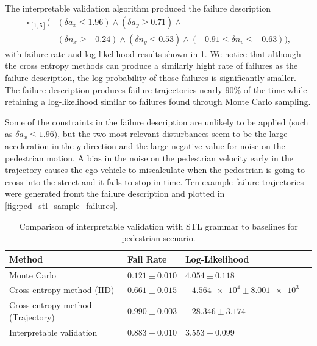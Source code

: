 The interpretable validation algorithm produced the failure description
\begin{equation}
\begin{split}
\square_{[1,5]}(&(\delta a_x \leq 1.96) \land (\delta a_y \geq 0.71) \land \\
&(\delta n_x \geq -0.24) \land (\delta n_y \leq 0.53) \land (-0.91 \leq \delta n_v \leq -0.63)) \label{eq:failure_description_pedstl} \text{,}
\end{split}
\end{equation}
with failure rate and log-likelihood results shown in \cref{tab:ped_results_stl}.  We notice that although the cross entropy methods can produce a similarly hight rate of failures as the failure description, the log probability of those failures is significantly smaller. The failure description produces failure trajectories nearly 90\% of the time while retaining a log-likelihood similar to failures found through Monte Carlo sampling. 

Some of the constraints in the failure description are unlikely to be applied (such as $\delta a_x \leq 1.96$), but the two most relevant disturbances seem to be the large acceleration in the $y$ direction and the large negative value for noise on the pedestrian motion. A bias in the noise on the pedestrian velocity early in the trajectory causes the ego vehicle to miscalculate when the pedestrian is going to cross into the street and it fails to stop in time. Ten example failure trajectories were generated fromt the failure description and plotted in \cref{fig:ped_stl_sample_failures}.

\begin{table}
    \centering
    \caption{Comparison of interpretable validation with STL grammar to baselines for pedestrian scenario.}
    \label{tab:ped_results_stl}
    \begin{tabular}{@{}llll@{}} 
        \toprule
        \textbf{Method} & \textbf{Fail Rate} & \textbf{Log-Likelihood} \\
        \midrule
        Monte Carlo & $0.121 \pm 0.010$ & $4.054 \pm 0.118$  \\
        Cross entropy method (IID) & $0.661 \pm 0.015$ & $\num{-4.564e4} \pm \num{8.001e3}$\\
        Cross entropy method (Trajectory) & $0.990 \pm 0.003$ & $-28.346 \pm 3.174$ \\
        Interpretable validation & $0.883 \pm 0.010$ & $3.553 \pm 0.099$ \\
        \bottomrule
    \end{tabular}
\end{table}

